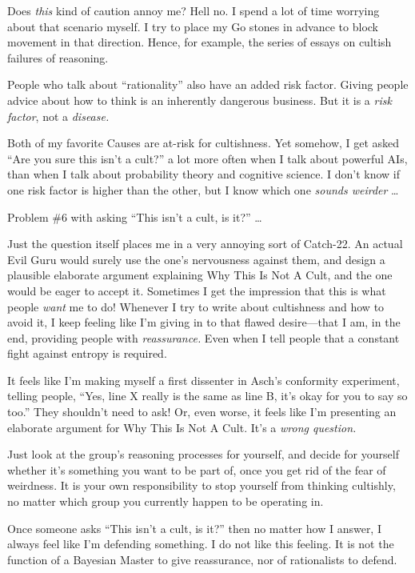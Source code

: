 {
 Does \textit{this} kind of caution annoy me? Hell no. I spend a
lot of time worrying about that scenario myself. I try to place my Go
stones in advance to block movement in that direction. Hence, for
example, the series of essays on cultish failures of reasoning.}

{
 People who talk about
``rationality'' also have an added
risk factor. Giving people advice about how to think is an inherently
dangerous business. But it is a \textit{risk factor}, not a
\textit{disease.}}

{
 Both of my favorite Causes are at-risk for cultishness. Yet
somehow, I get asked ``Are you sure this
isn't a cult?'' a lot more often when
I talk about powerful AIs, than when I talk about probability theory
and cognitive science. I don't know if one risk factor
is higher than the other, but I know which one \textit{sounds weirder}
\ldots}

{
 Problem \#6 with asking ``This
isn't a cult, is it?'' \ldots}

{
 Just the question itself places me in a very annoying sort of
Catch-22. An actual Evil Guru would surely use the
one's nervousness against them, and design a plausible
elaborate argument explaining Why This Is Not A Cult, and the one would
be eager to accept it. Sometimes I get the impression that this is what
people \textit{want} me to do! Whenever I try to write about
cultishness and how to avoid it, I keep feeling like
I'm giving in to that flawed desire---that I am, in the
end, providing people with \textit{reassurance.} Even when I tell
people that a constant fight against entropy is required.}

{
 It feels like I'm making myself a first dissenter
in Asch's conformity experiment, telling people,
``Yes, line X really is the same as line B,
it's okay for you to say so too.''
They shouldn't need to ask! Or, even worse, it feels
like I'm presenting an elaborate argument for Why This
Is Not A Cult. It's a \textit{wrong question.}}

{
 Just look at the group's reasoning processes for
yourself, and decide for yourself whether it's
something you want to be part of, once you get rid of the fear of
weirdness. It is your own responsibility to stop yourself from thinking
cultishly, no matter which group you currently happen to be operating
in.}

{
 Once someone asks ``This isn't a
cult, is it?'' then no matter how I answer, I always
feel like I'm defending something. I do not like this
feeling. It is not the function of a Bayesian Master to give
reassurance, nor of rationalists to defend.}

